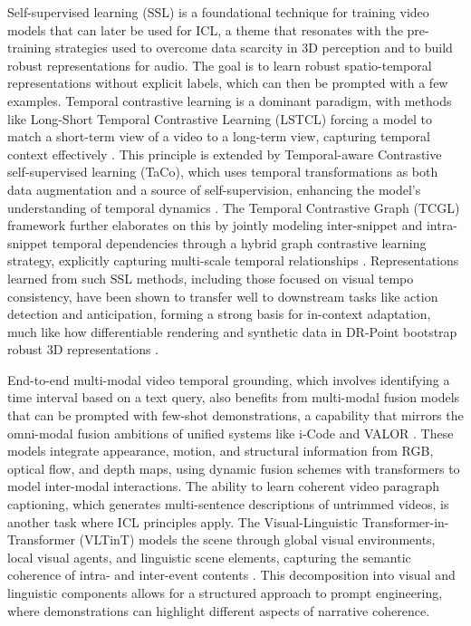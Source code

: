 \documentclass[11pt]{article}
\begin{document}
Self-supervised learning (SSL) is a foundational technique for training video models that can later be used for ICL, a theme that resonates with the pre-training strategies used to overcome data scarcity in 3D perception and to build robust representations for audio. The goal is to learn robust spatio-temporal representations without explicit labels, which can then be prompted with a few examples. Temporal contrastive learning is a dominant paradigm, with methods like Long-Short Temporal Contrastive Learning (LSTCL) forcing a model to match a short-term view of a video to a long-term view, capturing temporal context effectively \cite{ref273}. This principle is extended by Temporal-aware Contrastive self-supervised learning (TaCo), which uses temporal transformations as both data augmentation and a source of self-supervision, enhancing the model's understanding of temporal dynamics \cite{ref274}. The Temporal Contrastive Graph (TCGL) framework further elaborates on this by jointly modeling inter-snippet and intra-snippet temporal dependencies through a hybrid graph contrastive learning strategy, explicitly capturing multi-scale temporal relationships \cite{ref275}. Representations learned from such SSL methods, including those focused on visual tempo consistency, have been shown to transfer well to downstream tasks like action detection and anticipation, forming a strong basis for in-context adaptation, much like how differentiable rendering and synthetic data in DR-Point bootstrap robust 3D representations \cite{ref276}.

End-to-end multi-modal video temporal grounding, which involves identifying a time interval based on a text query, also benefits from multi-modal fusion models that can be prompted with few-shot demonstrations, a capability that mirrors the omni-modal fusion ambitions of unified systems like i-Code and VALOR \cite{ref277}. These models integrate appearance, motion, and structural information from RGB, optical flow, and depth maps, using dynamic fusion schemes with transformers to model inter-modal interactions. The ability to learn coherent video paragraph captioning, which generates multi-sentence descriptions of untrimmed videos, is another task where ICL principles apply. The Visual-Linguistic Transformer-in-Transformer (VLTinT) models the scene through global visual environments, local visual agents, and linguistic scene elements, capturing the semantic coherence of intra- and inter-event contents \cite{ref278}. This decomposition into visual and linguistic components allows for a structured approach to prompt engineering, where demonstrations can highlight different aspects of narrative coherence.
\end{document}
